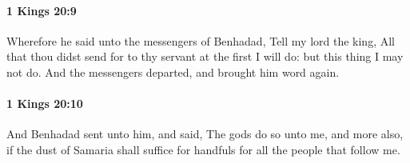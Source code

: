 		\paragraph{1 Kings 20:9} %
			\label{1KINGS-20-9}

			Wherefore he said unto the messengers of Benhadad, Tell my lord the king, All that thou didst send for to thy servant at the first I will do: but this thing I may not do. And the messengers departed, and brought him word again.


		\paragraph{1 Kings 20:10} %
			\label{1KINGS-20-10}

			And Benhadad sent unto him, and said, The gods do so unto me, and more also, if the dust of Samaria shall suffice for handfuls for all the people that follow me.

